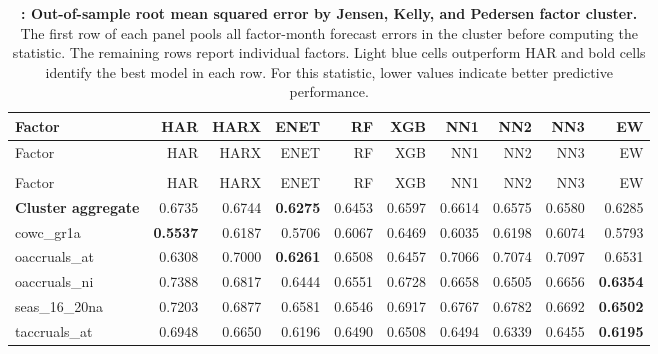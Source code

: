 \begingroup\scriptsize
\captionsetup{justification=raggedright,labelsep=none,singlelinecheck=false,labelformat=boldlabel}
\setlength{\tabcolsep}{2.5pt}
\begin{longtable}{>{\raggedright\arraybackslash}p{2.6cm}rrrrrrrrr}
\caption[Out-of-sample root mean squared error by Jensen, Kelly, and Pedersen factor cluster.]{\footnotesize \textbf{: Out-of-sample root mean squared error by Jensen, Kelly, and Pedersen factor cluster.} The first row of each panel pools all factor-month forecast errors in the cluster before computing the statistic. The remaining rows report individual factors. Light blue cells outperform HAR and bold cells identify the best model in each row. For this statistic, lower values indicate better predictive performance.}\label{tab:rv-factor_rmse}\\
\hline
Factor & HAR & HARX & ENET & RF & XGB & NN1 & NN2 & NN3 & EW \\
\hline\endfirsthead
\hline
Factor & HAR & HARX & ENET & RF & XGB & NN1 & NN2 & NN3 & EW \\
\hline\endhead
\hline\endfoot
\multicolumn{10}{@{}l}{\textit{Panel A. Accruals}} \\
\hline
Factor & HAR & HARX & ENET & RF & XGB & NN1 & NN2 & NN3 & EW \\
\hline
\textbf{Cluster aggregate} & 0.6735 & 0.6744 & \textbf{\cellcolor{blue!10}0.6275} & \cellcolor{blue!10}0.6453 & \cellcolor{blue!10}0.6597 & \cellcolor{blue!10}0.6614 & \cellcolor{blue!10}0.6575 & \cellcolor{blue!10}0.6580 & \cellcolor{blue!10}0.6285 \\
cowc\_gr1a & \textbf{0.5537} & 0.6187 & 0.5706 & 0.6067 & 0.6469 & 0.6035 & 0.6198 & 0.6074 & 0.5793 \\
oaccruals\_at & 0.6308 & 0.7000 & \textbf{\cellcolor{blue!10}0.6261} & 0.6508 & 0.6457 & 0.7066 & 0.7074 & 0.7097 & 0.6531 \\
oaccruals\_ni & 0.7388 & \cellcolor{blue!10}0.6817 & \cellcolor{blue!10}0.6444 & \cellcolor{blue!10}0.6551 & \cellcolor{blue!10}0.6728 & \cellcolor{blue!10}0.6658 & \cellcolor{blue!10}0.6505 & \cellcolor{blue!10}0.6656 & \textbf{\cellcolor{blue!10}0.6354} \\
seas\_16\_20na & 0.7203 & \cellcolor{blue!10}0.6877 & \cellcolor{blue!10}0.6581 & \cellcolor{blue!10}0.6546 & \cellcolor{blue!10}0.6917 & \cellcolor{blue!10}0.6767 & \cellcolor{blue!10}0.6782 & \cellcolor{blue!10}0.6692 & \textbf{\cellcolor{blue!10}0.6502} \\
taccruals\_at & 0.6948 & \cellcolor{blue!10}0.6650 & \cellcolor{blue!10}0.6196 & \cellcolor{blue!10}0.6490 & \cellcolor{blue!10}0.6508 & \cellcolor{blue!10}0.6494 & \cellcolor{blue!10}0.6339 & \cellcolor{blue!10}0.6455 & \textbf{\cellcolor{blue!10}0.6195} \\

\end{longtable}
